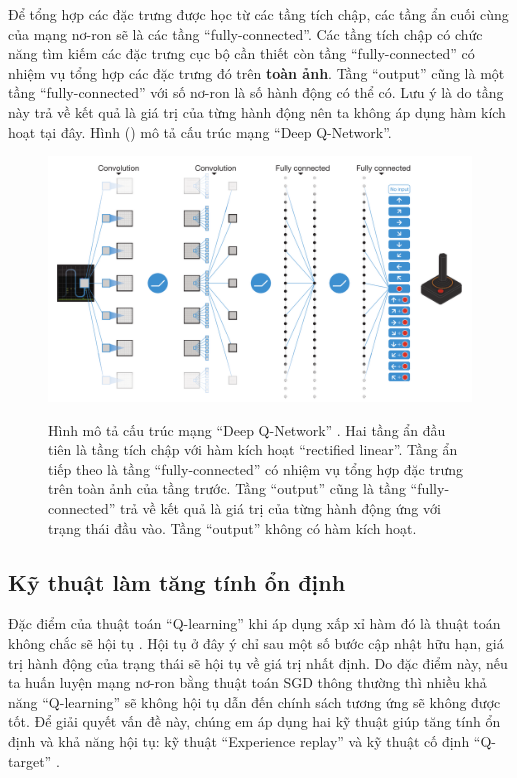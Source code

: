 	Để tổng hợp các đặc trưng được học từ các tầng tích chập, các tầng ẩn cuối cùng của mạng nơ-ron sẽ là các tầng ``fully-connected''.
	Các tầng tích chập có chức năng tìm kiếm các đặc trưng cục bộ cần thiết còn tầng ``fully-connected'' có nhiệm vụ tổng hợp các đặc trưng đó trên \textbf{toàn ảnh}.
	Tầng ``output'' cũng là một tầng ``fully-connected'' với số nơ-ron là số hành động có thể có.
	Lưu ý là do tầng này trả về kết quả là giá trị của từng hành động nên ta không áp dụng hàm kích hoạt tại đây.
	Hình () mô tả cấu trúc mạng ``Deep Q-Network''.
	\begin{figure}
		\centering
		\includegraphics[width=\textwidth]{dqn}
		\label{fig_dqn_nature}
		\caption[Cấu trúc mạng ``Deep Q-Network'']{Hình mô tả cấu trúc mạng ``Deep Q-Network'' \cite{mnihdqn2015}.
		Hai tầng ẩn đầu tiên là tầng tích chập với hàm kích hoạt ``rectified linear''.
		Tầng ẩn tiếp theo là tầng ``fully-connected'' có nhiệm vụ tổng hợp đặc trưng trên toàn ảnh của tầng trước.
		Tầng ``output'' cũng là tầng ``fully-connected'' trả về kết quả là giá trị của từng hành động ứng với trạng thái đầu vào.
		Tầng ``output'' không có hàm kích hoạt.}
	\end{figure}

\subsection{Kỹ thuật làm tăng tính ổn định}
	Đặc điểm của thuật toán ``Q-learning'' khi áp dụng xấp xỉ hàm đó là thuật toán không chắc sẽ hội tụ \cite{sutton1998introduction}.
	Hội tụ ở đây ý chỉ sau một số bước cập nhật hữu hạn, giá trị hành động của trạng thái sẽ hội tụ về giá trị nhất định.
	Do đặc điểm này, nếu ta huấn luyện mạng nơ-ron bằng thuật toán SGD thông thường thì nhiều khả năng ``Q-learning'' sẽ không hội tụ dẫn đến chính sách tương ứng sẽ không được tốt.
	Để giải quyết vấn đề này, chúng em áp dụng hai kỹ thuật giúp tăng tính ổn định và khả năng hội tụ: kỹ thuật ``Experience replay'' \cite{lin1993reinforcement} và kỹ thuật cố định ``Q-target'' \cite{mnih2013playing}.
	
